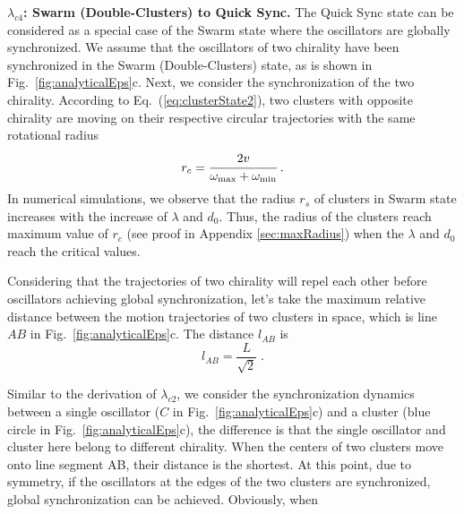 \documentclass[%
 aip,
 amsmath,amssymb,
 reprint,%
]{revtex4-1}
\begin{document}
\vspace{0.25cm}
\noindent\textbf{$\lambda_{c4}$: Swarm (Double-Clusters) to Quick Sync.}
The Quick Sync state can be considered as a special case of the Swarm state where the oscillators are globally synchronized. We assume that the oscillators of two chirality have been synchronized in the Swarm (Double-Clusters) state, as is shown in Fig.~\ref{fig:analyticalEps}c. Next, we consider the synchronization of the two chirality. According to Eq.~(\ref{eq:clusterState2}), two clusters with opposite chirality are moving on their respective circular trajectories with the same rotational radius
\begin{equation}
    r_c = \cfrac{2v}{\omega_{\max}+\omega_{\min}}\;.
\end{equation}
In numerical simulations, we observe that the radius $r_s$ of clusters in Swarm state increases with the increase of $\lambda$ and $d_0$. Thus, the radius of the clusters reach maximum value of $r_c$ (see proof in Appendix \ref{sec:maxRadius}) when the $\lambda$ and $d_0$ reach the critical values.

Considering that the trajectories of two chirality will repel each other before oscillators achieving global synchronization, let's take the maximum relative distance between the motion trajectories of two clusters in space, which is line $AB$ in Fig.~\ref{fig:analyticalEps}c. The distance $l_{AB}$ is
\begin{equation}
    l_{AB}=\frac{L}{\sqrt{2}}\;.
\end{equation}

Similar to the derivation of $\lambda_{c2}$, we consider the synchronization dynamics between a single oscillator ($C$ in Fig.~\ref{fig:analyticalEps}c) and a cluster (blue circle in Fig.~\ref{fig:analyticalEps}c), the difference is that the single oscillator and cluster here belong to different chirality. When the centers of two clusters move onto line segment AB, their distance is the shortest. At this point, due to symmetry, if the oscillators at the edges of the two clusters are synchronized, global synchronization can be achieved. Obviously, when 
\end{document}
